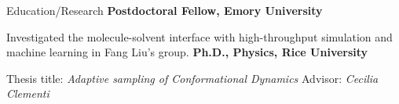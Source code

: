 \begin{rubric}{Education/Research}
%
	\textbf{Postdoctoral Fellow, Emory University}
  \par Investigated the molecule-solvent interface with high-throughput simulation and machine learning in Fang Liu's group. 
\entry*[2014 -- 2020]%
  \textbf{Ph.D., Physics, Rice University}
  \par Thesis title: \emph{Adaptive sampling of Conformational Dynamics} Advisor: \emph{Cecilia Clementi}
\end{rubric}
